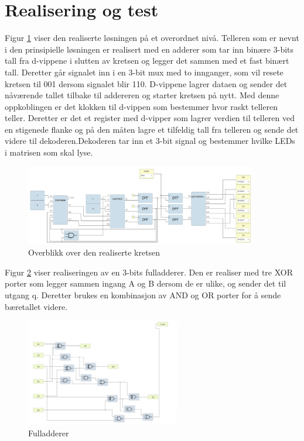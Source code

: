 \section{Realisering og test}
\label{realiseringOgTest}


Figur \ref{fig:Fig2} viser den realiserte løsningen på et overordnet nivå. Telleren som er nevnt i den prinsipielle løsningen er realisert med en adderer som tar inn binære 3-bits tall fra d-vippene i slutten av kretsen og legger det sammen med et fast binært tall. Deretter går signalet inn i en 3-bit mux med to innganger, som vil resete kretsen til 001 dersom signalet blir 110. D-vippene lagrer dataen og sender det nåværende tallet tilbake til addereren og starter kretsen på nytt. Med denne oppkoblingen er det klokken til d-vippen som bestemmer hvor raskt telleren teller. Deretter er det et register med d-vipper som lagrer verdien til telleren ved en stigenede flanke og på den måten lagre et tilfeldig tall fra telleren og sende det videre til dekoderen.Dekoderen tar inn et 3-bit signal og bestemmer hvilke LEDs i matrisen som skal lyse.

\begin{figure}[htbp]
  \centering
  \includegraphics[width=0.9\textwidth]{Bilder/Realisert.png} 
  \caption{Overblikk over den realiserte kretsen}
  \label{fig:Fig2}
\end{figure}


Figur \ref{fig:Fig3} viser realiseringen av en 3-bits fulladderer. Den er realiser med tre XOR porter som legger sammen ingang A og B dersom de er ulike, og sender det til utgang q. Deretter brukes en kombinasjon av AND og OR porter for å sende bæretallet videre. 

\begin{figure}[htbp]
  \centering
  \includegraphics[width=0.6\textwidth]{Bilder/3-bit_adderer.png} 
  \caption{Fulladderer}
  \label{fig:Fig3}
\end{figure}

